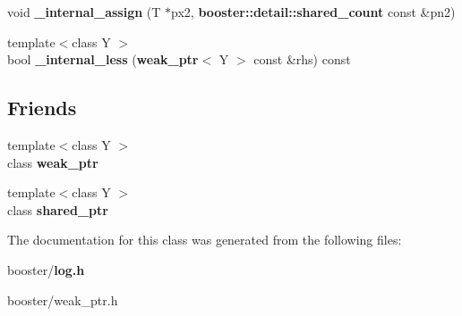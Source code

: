 \begin{DoxyCompactItemize}
\item 
void {\bfseries \-\_\-internal\-\_\-assign} (T $\ast$px2, {\bf booster\-::detail\-::shared\-\_\-count} const \&pn2)\label{classbooster_1_1weak__ptr_a25735d2007d3d902fecbbc62baa5f68d}

\item 
{\footnotesize template$<$class Y $>$ }\\bool {\bfseries \-\_\-internal\-\_\-less} ({\bf weak\-\_\-ptr}$<$ Y $>$ const \&rhs) const \label{classbooster_1_1weak__ptr_add37bcc06d008e84a977813a11932249}

\end{DoxyCompactItemize}
\subsection*{Friends}
\begin{DoxyCompactItemize}
\item 
{\footnotesize template$<$class Y $>$ }\\class {\bfseries weak\-\_\-ptr}\label{classbooster_1_1weak__ptr_a27df6e2a1650d985bdeda33f0303c83f}

\item 
{\footnotesize template$<$class Y $>$ }\\class {\bfseries shared\-\_\-ptr}\label{classbooster_1_1weak__ptr_ab2104fa6e839672da3c30400e8325e52}

\end{DoxyCompactItemize}


The documentation for this class was generated from the following files\-:\begin{DoxyCompactItemize}
\item 
booster/{\bf log.\-h}\item 
booster/weak\-\_\-ptr.\-h\end{DoxyCompactItemize}
